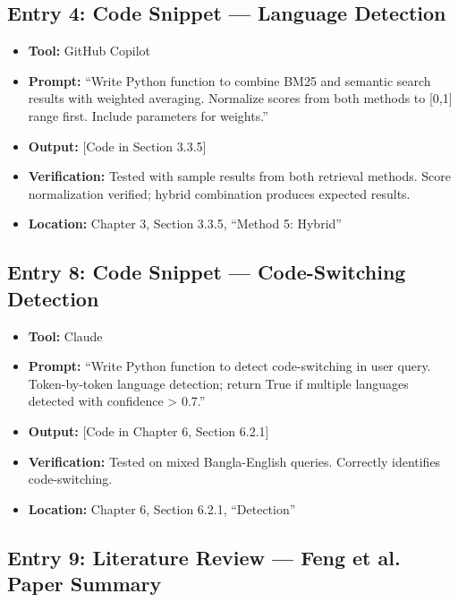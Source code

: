 \documentclass[12pt,a4paper]{report}
\begin{document}
\subsection{Entry 4: Code Snippet --- Language Detection}

\begin{itemize}
    \item \textbf{Tool:} GitHub Copilot
    \item \textbf{Prompt:} ``Write Python function to combine BM25 and semantic search results with weighted averaging. Normalize scores from both methods to [0,1] range first. Include parameters for weights.''
    \item \textbf{Output:} [Code in Section 3.3.5]
    \item \textbf{Verification:} Tested with sample results from both retrieval methods. Score normalization verified; hybrid combination produces expected results.
    \item \textbf{Location:} Chapter 3, Section 3.3.5, ``Method 5: Hybrid''
\end{itemize}

\subsection{Entry 8: Code Snippet --- Code-Switching Detection}

\begin{itemize}
    \item \textbf{Tool:} Claude
    \item \textbf{Prompt:} ``Write Python function to detect code-switching in user query. Token-by-token language detection; return True if multiple languages detected with confidence > 0.7.''
    \item \textbf{Output:} [Code in Chapter 6, Section 6.2.1]
    \item \textbf{Verification:} Tested on mixed Bangla-English queries. Correctly identifies code-switching.
    \item \textbf{Location:} Chapter 6, Section 6.2.1, ``Detection''
\end{itemize}

\subsection{Entry 9: Literature Review --- Feng et al. Paper Summary}
\end{document}
